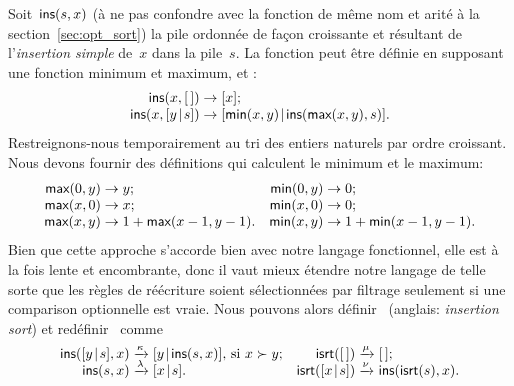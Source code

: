Soit~\(\textsf{ins}(s,x)\) (à ne pas confondre
avec la fonction de même nom et arité à la section~\ref{sec:opt_sort})
la pile ordonnée de façon croissante et résultant de l'\emph{insertion
  simple} de~\(x\) dans la pile~\(s\). La fonction  peut
être définie en supposant une fonction minimum et maximum,
 et
:
\begin{equation*}
\begin{array}{@{}r@{\;}l@{\;}l@{}}
\fun{ins}(x,\el) & \rightarrow & [x];\\
\fun{ins}(x,\cons{y}{s}) & \rightarrow &
\cons{\fun{min}(x,y)}{\fun{ins}(\fun{max}(x,y),s)}.
\end{array}
\end{equation*}
Restreignons-nous temporairement au tri des entiers naturels par ordre
croissant. Nous devons fournir des définitions qui calculent le
minimum et le maximum:
\begin{equation*}
\begin{array}{@{}r@{\;}l@{\;}lr@{\;}l@{\;}l@{}}
  \fun{max}(0,y) & \rightarrow & y; & \fun{min}(0,y) & \rightarrow & 0;\\
  \fun{max}(x,0) & \rightarrow & x; & \fun{min}(x,0) & \rightarrow & 0;\\
  \fun{max}(x,y) & \rightarrow & 1 + \fun{max}(x-1,y-1).
& \fun{min}(x,y) & \rightarrow & 1 + \fun{min}(x-1,y-1).
\end{array}
\end{equation*}
Bien que cette approche s'accorde bien avec notre langage fonctionnel,
elle est à la fois lente et encombrante, donc il vaut mieux étendre
notre langage de telle sorte que les règles de réécriture soient
sélectionnées par filtrage seulement si une comparison optionnelle est
vraie. Nous pouvons alors
définir~ (anglais:
\emph{insertion sort}) et
redéfinir~ comme
\begin{equation*}
\begin{array}{@{}r@{\;}l@{\;}lr@{\;}l@{\;}l@{}}
  \fun{ins}(\cons{y}{s},x)
& \xrightarrow{\smash{\kappa}}
& \cons{y}{\fun{ins}(s,x)}, \,\text{si \(x \succ y\)};
& \fun{isrt}(\el)
& \xrightarrow{\smash{\mu}}
& \el;\\
  \fun{ins}(s,x)
& \xrightarrow{\smash{\lambda}}
& \cons{x}{s}.
& \fun{isrt}(\cons{x}{s})
& \xrightarrow{\smash{\nu}}
& \fun{ins}(\fun{isrt}(s),x).
\end{array}
\end{equation*}
